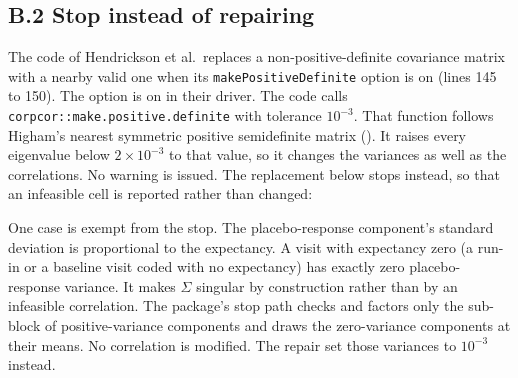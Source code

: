 \documentclass[
  11pt,
]{article}
\newenvironment{Shaded}{\begin{snugshade}}{\end{snugshade}}
\newcommand{\CommentTok}[1]{\textcolor[rgb]{0.56,0.35,0.01}{\textit{#1}}}
\newcommand{\ControlFlowTok}[1]{\textcolor[rgb]{0.13,0.29,0.53}{\textbf{#1}}}
\newcommand{\FunctionTok}[1]{\textcolor[rgb]{0.13,0.29,0.53}{\textbf{#1}}}
\newcommand{\NormalTok}[1]{#1}
\newcommand{\SpecialCharTok}[1]{\textcolor[rgb]{0.81,0.36,0.00}{\textbf{#1}}}
\newcommand{\StringTok}[1]{\textcolor[rgb]{0.31,0.60,0.02}{#1}}
\begin{document}
\subsection*{B.2 Stop instead of repairing}\label{b.2-stop-instead-of-repairing}

The code of Hendrickson et al.~replaces a non-positive-definite
covariance matrix with a nearby valid one when its
\texttt{makePositiveDefinite} option is on (lines 145 to 150). The option is
on in their driver. The code calls \texttt{corpcor::make.positive.definite}
with tolerance \(10^{-3}\). That
function follows Higham's nearest symmetric positive semidefinite
matrix (). It raises every eigenvalue below
\(2 \times 10^{-3}\) to that value, so it changes the variances as well
as the correlations. No warning is issued. The replacement below stops
instead, so that an infeasible cell is reported rather than changed:

\begin{Shaded}
\end{Shaded}

One case is exempt from the stop. The placebo-response component's
standard deviation is proportional to the expectancy. A visit with
expectancy zero (a run-in or a baseline visit coded with no
expectancy) has exactly zero placebo-response variance. It makes
\(\Sigma\) singular by construction rather than by an infeasible
correlation. The package's stop path checks and factors only the
sub-block of positive-variance components and draws the zero-variance
components at their means. No correlation is modified. The repair
set those variances to \(10^{-3}\) instead.
\end{document}
